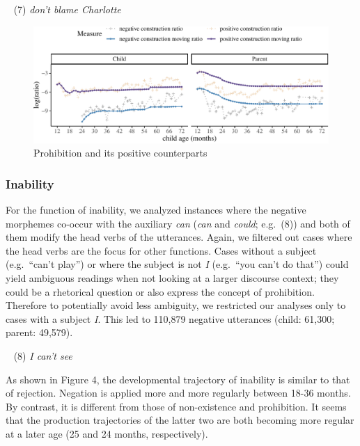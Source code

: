 \documentclass[
  english,
  man,floatsintext]{apa6}
\begin{document}
~
(7) \emph{don't blame Charlotte}

\begin{figure}[H]

{\centering \includegraphics{neg_construction_article_files/figure-latex/prohibition-1} 

}

\caption{Prohibition and its positive counterparts}\label{fig:prohibition}
\end{figure}

\clearpage

\hypertarget{inability}{%
\subsubsection{Inability}\label{inability}}

For the function of inability, we analyzed instances where the negative morphemes co-occur with the auxiliary \emph{can} (\emph{can} and \emph{could}; e.g.~(8)) and both of them modify the head verbs of the utterances. Again, we filtered out cases where the head verbs are the focus for other functions. Cases without a subject (e.g.~\enquote{can't play}) or where the subject is not \emph{I} (e.g.~\enquote{you can't do that}) could yield ambiguous readings when not looking at a larger discourse context; they could be a rhetorical question or also express the concept of prohibition. Therefore to potentially avoid less ambiguity, we restricted our analyses only to cases with a subject \emph{I}. This led to 110,879 negative utterances (child: 61,300; parent: 49,579).

~
(8) \emph{I can't see}

As shown in Figure 4, the developmental trajectory of inability is similar to that of rejection. Negation is applied more and more regularly between 18-36 months. By contrast, it is different from those of non-existence and prohibition. It seems that the production trajectories of the latter two are both becoming more regular at a later age (25 and 24 months, respectively).
\end{document}
